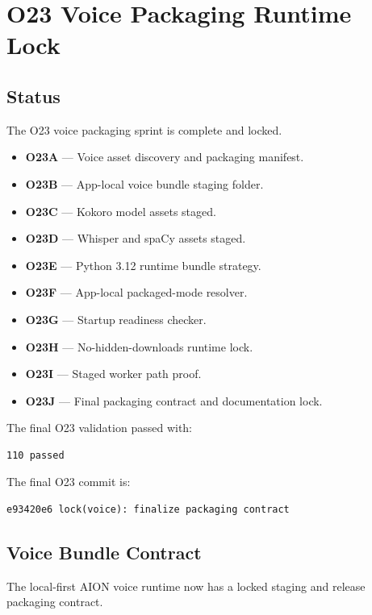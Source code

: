 \section{O23 Voice Packaging Runtime Lock}

\subsection{Status}

The O23 voice packaging sprint is complete and locked.

\begin{itemize}
  \item \textbf{O23A} --- Voice asset discovery and packaging manifest.
  \item \textbf{O23B} --- App-local voice bundle staging folder.
  \item \textbf{O23C} --- Kokoro model assets staged.
  \item \textbf{O23D} --- Whisper and spaCy assets staged.
  \item \textbf{O23E} --- Python 3.12 runtime bundle strategy.
  \item \textbf{O23F} --- App-local packaged-mode resolver.
  \item \textbf{O23G} --- Startup readiness checker.
  \item \textbf{O23H} --- No-hidden-downloads runtime lock.
  \item \textbf{O23I} --- Staged worker path proof.
  \item \textbf{O23J} --- Final packaging contract and documentation lock.
\end{itemize}

The final O23 validation passed with:

\begin{verbatim}
110 passed
\end{verbatim}

The final O23 commit is:

\begin{verbatim}
e93420e6 lock(voice): finalize packaging contract
\end{verbatim}

\subsection{Voice Bundle Contract}

The local-first AION voice runtime now has a locked staging and release packaging contract.


